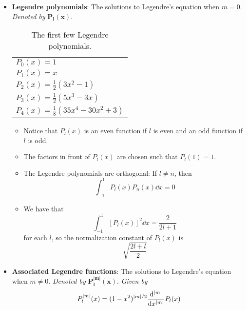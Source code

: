 \documentclass[../notes.tex]{subfiles}
\begin{document}
\begin{itemize}
\begin{itemize}
    \end{itemize}
    \item \textbf{Legendre polynomials}: The solutions to Legendre's equation when $m=0$. \emph{Denoted by} $\bm{P_l(x)}$.
    \begin{table}[h!]
        \centering
        \small
        \renewcommand{\arraystretch}{1.4}
        \begin{tabular}{l}
            \toprule
            $P_0(x)=1$\\
            $P_1(x)=x$\\
            $P_2(x)=\frac{1}{2}(3x^2-1)$\\
            $P_3(x)=\frac{1}{2}(5x^3-3x)$\\
            $P_4(x)=\frac{1}{8}(35x^4-30x^2+3)$\\
            \bottomrule
        \end{tabular}
        \caption{The first few Legendre polynomials.}
        \label{tab:legendrePolynomials}
    \end{table}
    \begin{itemize}
        \item Notice that $P_l(x)$ is an even function if $l$ is even and an odd function if $l$ is odd.
        \item The factors in front of $P_l(x)$ are chosen such that $P_l(1)=1$.
        \item The Legendre polynomials are orthogonal: If $l\neq n$, then
        \begin{equation*}
            \int_{-1}^1P_l(x)P_n(x)\dd{x} = 0
        \end{equation*}
        \item We have that
        \begin{equation*}
            \int_{-1}^1[P_l(x)]^2\dd{x} = \frac{2}{2l+1}
        \end{equation*}
        for each $l$, so the normalization constant of $P_l(x)$ is
        \begin{equation*}
            \sqrt{\frac{2l+l}{2}}
        \end{equation*}
    \end{itemize}
    \item \textbf{Associated Legendre functions}: The solutions to Legendre's equation when $m\neq 0$. \emph{Denoted by} $\bm{P_l^{|m|}(x)}$. \emph{Given by}
    \begin{equation*}
        P_l^{|m|}(x) = (1-x^2)^{|m|/2}\dv[|m|]{x}P_l(x)
    \end{equation*}

\end{itemize}
\end{document}
